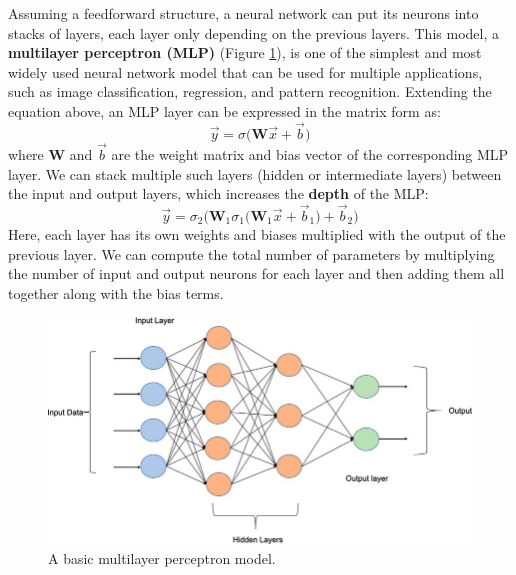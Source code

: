 Assuming a feedforward structure, a neural network can put its neurons into stacks of layers, each layer only depending on the previous layers. This model, a \textbf{multilayer perceptron (MLP)} (Figure \ref{fig:mlp}), is one of the simplest and most widely used neural network model that can be used for multiple applications, such as image classification, regression, and pattern recognition. Extending the equation above, an MLP layer can be expressed in the matrix form as:
\begin{equation}
\vec{y} = \sigma \biggl(\mathbf{W}\vec{x} + \vec{b} \biggr)
\end{equation}
where $\mathbf{W}$ and $\vec{b}$ are the weight matrix and bias vector of the corresponding MLP layer. We can stack multiple such layers (hidden or intermediate layers) between the input and output layers, which increases the \textbf{depth} of the MLP:
\begin{equation}
\vec{y} = \sigma_2 \biggl( \mathbf{W}_1\sigma_1 \biggl(\mathbf{W}_1\vec{x} + \vec{b}_1 \biggr) + \vec{b}_2\biggr) 
\end{equation}
Here, each layer has its own weights and biases multiplied with the output of the previous layer. We can compute the total number of parameters by multiplying the number of input and output neurons for each layer and then adding them all together along with the bias terms. 



\begin{figure}[ht]
  \centering
   \includegraphics[width=0.8\linewidth]{Images/MLP.jpeg}
   \caption{A basic multilayer perceptron model.}
   \label{fig:mlp}
\end{figure}

